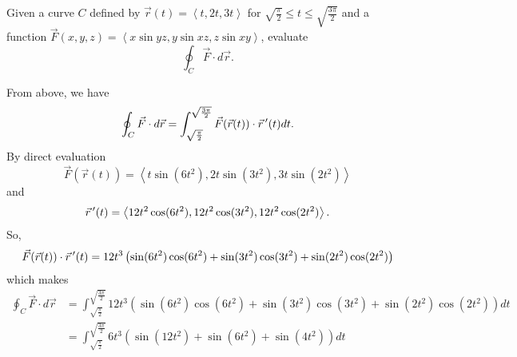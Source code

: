 \begin{example}
    Given a curve $C$ defined by $\vec{r}(t) = \left<t, 2t, 3t\right>$ for $\sqrt{\frac{\pi}{2}} \leq t \leq \sqrt{\frac{3\pi}{2}}$ and a function $\vec{F}(x, y, z) = \left<x\sin yz, y\sin xz, z\sin xy\right>$, evaluate
    \[\oint_{C}\vec{F} \cdot d\vec{r}.\]

    \begin{soln}
        From above, we have
        \[\oint_{C}\vec{F} \cdot d\vec{r} = \int_{\sqrt{\frac{\pi}{2}}}^{\sqrt{\frac{3\pi}{2}}}\vec{F}(\vec{r}(t)) \cdot \vec{r}\,^{\prime}(t)dt.\]
        By direct evaluation
        \[\vec{F}(\vec{r}(t)) = \left<t\sin(6t^{2}), 2t\sin(3t^{2}), 3t\sin(2t^{2})\right>\]
        and
        \[\vec{r}\,^{\prime}(t) = \left<12t^{2}\cos(6t^{2}), 12t^{2}\cos(3t^{2}), 12t^{2}\cos(2t^{2})\right>.\]
        So,
        \[\vec{F}(\vec{r}(t)) \cdot \vec{r}\,^{\prime}(t) = 12t^{3}\left(\sin(6t^{2})\cos(6t^{2}) + \sin(3t^{2})\cos(3t^{2}) + \sin(2t^{2})\cos(2t^{2})\right)\]
        which makes
        \begin{align*}
            \oint_{C}\vec{F} \cdot d\vec{r} &= \int_{\sqrt{\frac{\pi}{2}}}^{\sqrt{\frac{3\pi}{2}}}12t^{3}\left(\sin(6t^{2})\cos(6t^{2}) + \sin(3t^{2})\cos(3t^{2}) + \sin(2t^{2})\cos(2t^{2})\right)dt \\
            &= \int_{\sqrt{\frac{\pi}{2}}}^{\sqrt{\frac{3\pi}{2}}}6t^{3}\left(\sin(12t^{2}) + \sin(6t^{2}) + \sin(4t^{2})\right)dt
        \end{align*}
    \end{soln}
\end{example}